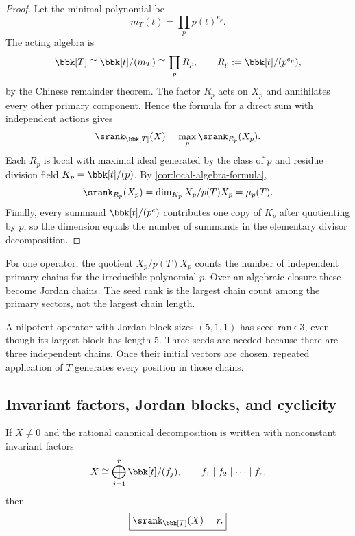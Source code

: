 \begin{proof}
Let the minimal polynomial be
\[
m_T(t)=\prod_{p}p(t)^{e_p}.
\]
The acting algebra is
\[
\bbk[T]\cong\bbk[t]/(m_T)
\cong\prod_pR_p,
\qquad
R_p:=\bbk[t]/(p^{e_p}),
\]
by the Chinese remainder theorem.  The factor $R_p$ acts on $X_p$ and annihilates every other primary component.  Hence the formula for a direct sum with independent actions gives
\[
\srank_{\bbk[T]}(X)=\max_p\srank_{R_p}(X_p).
\]
Each $R_p$ is local with maximal ideal generated by the class of $p$ and residue division field $K_p=\bbk[t]/(p)$.  By \cref{cor:local-algebra-formula},
\[
\srank_{R_p}(X_p)
=
\dim_{K_p}X_p/p(T)X_p
=
\mu_p(T).
\]
Finally, every summand $\bbk[t]/(p^e)$ contributes one copy of $K_p$ after quotienting by $p$, so the dimension equals the number of summands in the elementary divisor decomposition.
\end{proof}

\begin{interpretation}
For one operator, the quotient \(X_p/p(T)X_p\) counts the number of independent primary chains for the irreducible polynomial \(p\).  Over an algebraic closure these become Jordan chains.  The seed rank is the largest chain count among the primary sectors, not the largest chain length.
\end{interpretation}

\begin{microexample}[title={Block count versus block size}]
A nilpotent operator with Jordan block sizes \((5,1,1)\) has seed rank \(3\), even though its largest block has length \(5\).  Three seeds are needed because there are three independent chains.  Once their initial vectors are chosen, repeated application of \(T\) generates every position in those chains.
\end{microexample}


\subsection{Invariant factors, Jordan blocks, and cyclicity}
\begin{corollary}
\label{cor:invariant-factor-count}
If $X\neq0$ and the rational canonical decomposition is written with nonconstant invariant factors
\[
X\cong\bigoplus_{j=1}^{r}\bbk[t]/(f_j),
\qquad
f_1\mid f_2\mid\cdots\mid f_r,
\]
then
\[
\boxed{\srank_{\bbk[T]}(X)=r.}
\]
\end{corollary}

